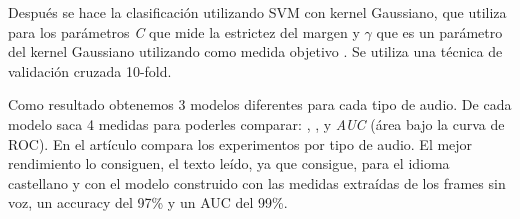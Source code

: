 \begin{itemize}
	Después se hace la clasificación utilizando SVM con kernel Gaussiano, que utiliza  para los parámetros \textit{C} que mide la estrictez del margen y $\gamma$ que es un parámetro del kernel Gaussiano utilizando como medida objetivo . Se utiliza una técnica de validación cruzada 10-fold.
	
	Como resultado obtenemos 3 modelos diferentes para cada tipo de audio. De cada modelo saca 4 medidas para poderles comparar: , ,  y \textit{AUC} (área bajo la curva de ROC). En el artículo compara los experimentos por tipo de audio. El mejor rendimiento lo consiguen, el texto leído, ya que consigue, para el idioma castellano y con el modelo construido con las medidas extraídas de los frames sin voz, un accuracy del 97\% y un AUC del 99\%.
	

\end{itemize}

